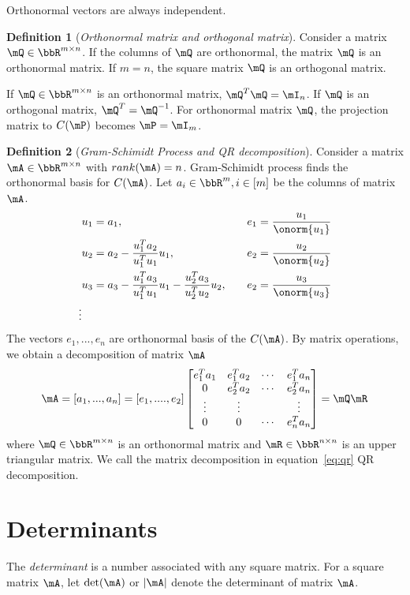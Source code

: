 \documentclass[11pt]{article}
\theoremstyle{plain}
\theoremstyle{definition}
\newtheorem{defn}{Definition}
\begin{document}
Orthonormal vectors are always independent.

\begin{defn}[\textit{Orthonormal matrix and orthogonal matrix}]\label{def:orthonom}
	Consider a matrix $\mQ \in \bbR^{m \times n}$. If the columns of $\mQ$ are orthonormal, the matrix $\mQ$ is an orthonormal matrix. If $ m= n$, the square matrix $\mQ$ is an orthogonal matrix.
\end{defn}

If $\mQ \in \bbR^{m \times n}$ is an orthonormal matrix, $\mQ^T \mQ = \mI_n$.  If $\mQ$ is an orthogonal matrix, $\mQ^T = \mQ^{-1}$.
For orthonormal matrix $\mQ$, the projection matrix to $C(\mP)$  becomes $\mP = \mI_m$.

\begin{defn}[\textit{Gram-Schimidt Process and QR decomposition}]\label{gram-schimidt}
Consider a matrix $\mA \in \bbR^{m \times n}$ with $rank(\mA) = n$. Gram-Schimidt process finds the orthonormal basis for $C(\mA)$. Let $a_i \in \bbR^{m}, i \in [m]$ be the columns of matrix $\mA$. 
\begin{align}
	&u_1 = a_1, &&\quad e_1 = \frac{u_1}{\onorm{u_1}}\\
	&u_2 = a_2 - \frac{u_1^T a_2}{u_1^T u_1} u_1 ,&&\quad  e_2 = \frac{u_2}{\onorm{u_2}}\\
	&u_3 = a_3 - \frac{u_1^T a_3}{u_1^T u_1} u_1 - \frac{u_2^T a_3}{u_2^T u_2} u_2,&&\quad  e_2 = \frac{u_3}{\onorm{u_3}}\\
	\vdots
\end{align}
 The vectors $e_1,...,e_n$ are orthonormal basis of the $C(\mA)$. By matrix operations, we obtain a decomposition of matrix $\mA$
 \begin{equation}\label{eq:qr}
 	\mA = [a_1,...,a_n] = [e_1,....,e_2] \begin{bmatrix}
 		e_1^T a_1 & e_1^T a_2 & \cdots & e_1^T a_n\\
 		0&e_2^T a_2 & \cdots & e_2^T a_n\\
 		\vdots &\vdots & & \vdots \\
 		0 &0&\cdots & e_n^T a_n
 	\end{bmatrix} = \mQ \mR
 \end{equation}
	where $\mQ \in \bbR^{m \times n}$ is an orthonormal matrix and $\mR \in \bbR^{n \times n}$ is an upper triangular matrix. We call the matrix decomposition in equation~\eqref{eq:qr} QR decomposition.
\end{defn}

\section{Determinants}
The \textit{determinant} is a number associated with any square matrix. For a square matrix $\mA$, let $\det(\mA)$ or $|\mA|$ denote the determinant of matrix $\mA$.
\end{document}
